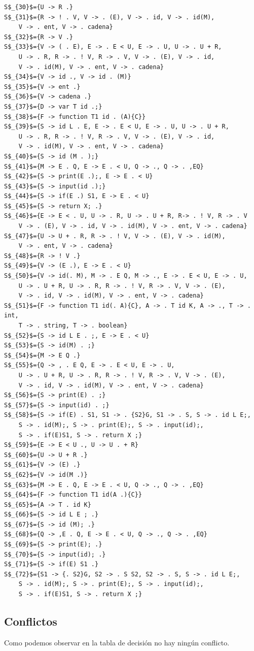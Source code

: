 \documentclass[a4paper, 12pt]{article}
\begin{document}
\begin{lstlisting}
S$_{30}$={U -> R .}
S$_{31}$={R -> ! . V, V -> . (E), V -> . id, V -> . id(M), 
	V -> . ent, V -> . cadena}
S$_{32}$={R -> V .}
S$_{33}$={V -> ( . E), E -> . E < U, E -> . U, U -> . U + R,
	U -> . R, R -> . ! V, R -> . V, V -> . (E), V -> . id,
	V -> . id(M), V -> . ent, V -> . cadena}
S$_{34}$={V -> id ., V -> id . (M)}
S$_{35}$={V -> ent .}
S$_{36}$={V -> cadena .}
S$_{37}$={D -> var T id .;}
S$_{38}$={F -> function T1 id . (A){C}}
S$_{39}$={S -> id L . E, E -> . E < U, E -> . U, U -> . U + R,
	U -> . R, R -> . ! V, R -> . V, V -> . (E), V -> . id,
	V -> . id(M), V -> . ent, V -> . cadena}
S$_{40}$={S -> id (M . );}
S$_{41}$={M -> E . Q, E -> E . < U, Q -> ., Q -> . ,EQ}
S$_{42}$={S -> print(E .);, E -> E . < U}
S$_{43}$={S -> input(id .);}
S$_{44}$={S -> if(E .) S1, E -> E . < U}
S$_{45}$={S -> return X; .}
S$_{46}$={E -> E < . U, U -> . R, U -> . U + R, R-> . ! V, R -> . V
	V -> . (E), V -> . id, V -> . id(M), V -> . ent, V -> . cadena}
S$_{47}$={U -> U + . R, R -> . ! V, V -> . (E), V -> . id(M), 
	V -> . ent, V -> . cadena}
S$_{48}$={R -> ! V .}
S$_{49}$={V -> (E .), E -> E . < U}
S$_{50}$={V -> id(. M), M -> . E Q, M -> ., E -> . E < U, E -> . U, 
	U -> . U + R, U -> . R, R -> . ! V, R -> . V, V -> . (E),
	V -> . id, V -> . id(M), V -> . ent, V -> . cadena}
S$_{51}$={F -> function T1 id(. A){C}, A -> . T id K, A -> ., T -> . int,
	T -> . string, T -> . boolean}
S$_{52}$={S -> id L E . ;, E -> E . < U}
S$_{53}$={S -> id(M) . ;}
S$_{54}$={M -> E Q .}
S$_{55}$={Q -> , . E Q, E -> . E < U, E -> . U, 
	U -> . U + R, U -> . R, R -> . ! V, R -> . V, V -> . (E),
	V -> . id, V -> . id(M), V -> . ent, V -> . cadena}
S$_{56}$={S -> print(E) . ;}
S$_{57}$={S -> input(id) . ;}
S$_{58}$={S -> if(E) . S1, S1 -> . {S2}G, S1 -> . S, S -> . id L E;,
	S -> . id(M);, S -> . print(E);, S -> . input(id);,
	S -> . if(E)S1, S -> . return X ;}
S$_{59}$={E -> E < U ., U -> U . + R}
S$_{60}$={U -> U + R .}
S$_{61}$={V -> (E) .}
S$_{62}$={V -> id(M .)}
S$_{63}$={M -> E . Q, E -> E . < U, Q -> ., Q -> . ,EQ}
S$_{64}$={F -> function T1 id(A .){C}}
S$_{65}$={A -> T . id K}
S$_{66}$={S -> id L E ; .}
S$_{67}$={S -> id (M); .}
S$_{68}$={Q -> ,E . Q, E -> E . < U, Q -> ., Q -> . ,EQ}
S$_{69}$={S -> print(E); .}
S$_{70}$={S -> input(id); .}
S$_{71}$={S -> if(E) S1 .}
S$_{72}$={S1 -> {. S2}G, S2 -> . S S2, S2 -> . S, S -> . id L E;,
	S -> . id(M);, S -> . print(E);, S -> . input(id);,
	S -> . if(E)S1, S -> . return X ;}
\end{lstlisting}

\subsection{Conflictos}
Como podemos observar en la tabla de decisión no hay ningún conflicto.
\end{document}
